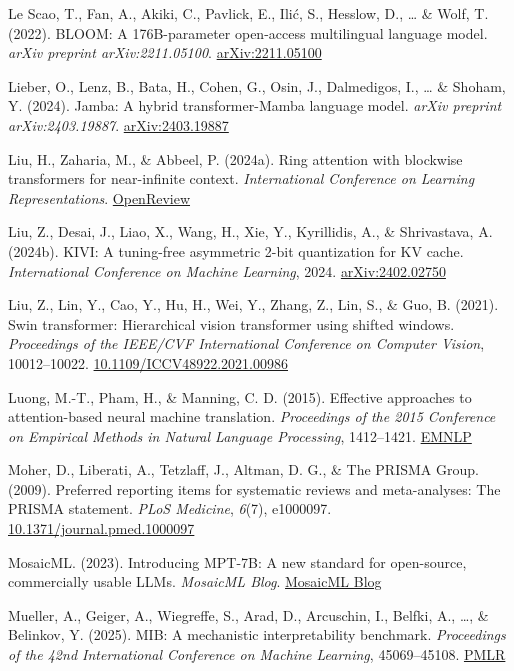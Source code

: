 \documentclass[10pt,twocolumn]{article}
\begin{document}
Le Scao, T., Fan, A., Akiki, C., Pavlick, E., Ilić, S., Hesslow, D., \ldots{} \& Wolf, T. (2022). BLOOM: A 176B-parameter open-access multilingual language model. \emph{arXiv preprint arXiv:2211.05100}. \href{https://arxiv.org/abs/2211.05100}{arXiv:2211.05100}

Lieber, O., Lenz, B., Bata, H., Cohen, G., Osin, J., Dalmedigos, I., \ldots{} \& Shoham, Y. (2024). Jamba: A hybrid transformer-Mamba language model. \emph{arXiv preprint arXiv:2403.19887}. \href{https://arxiv.org/abs/2403.19887}{arXiv:2403.19887}

Liu, H., Zaharia, M., \& Abbeel, P. (2024a). Ring attention with blockwise transformers for near-infinite context. \emph{International Conference on Learning Representations}. \href{https://openreview.net/forum?id=4po1ygKu5b}{OpenReview}

Liu, Z., Desai, J., Liao, X., Wang, H., Xie, Y., Kyrillidis, A., \& Shrivastava, A. (2024b). KIVI: A tuning-free asymmetric 2-bit quantization for KV cache. \emph{International Conference on Machine Learning}, 2024. \href{https://arxiv.org/abs/2402.02750}{arXiv:2402.02750}

Liu, Z., Lin, Y., Cao, Y., Hu, H., Wei, Y., Zhang, Z., Lin, S., \& Guo, B. (2021). Swin transformer: Hierarchical vision transformer using shifted windows. \emph{Proceedings of the IEEE/CVF International Conference on Computer Vision}, 10012--10022. \href{https://doi.org/10.1109/ICCV48922.2021.00986}{10.1109/ICCV48922.2021.00986}

Luong, M.-T., Pham, H., \& Manning, C. D. (2015). Effective approaches to attention-based neural machine translation. \emph{Proceedings of the 2015 Conference on Empirical Methods in Natural Language Processing}, 1412--1421. \href{https://aclanthology.org/D15-1166}{EMNLP}

Moher, D., Liberati, A., Tetzlaff, J., Altman, D. G., \& The PRISMA Group. (2009). Preferred reporting items for systematic reviews and meta-analyses: The PRISMA statement. \emph{PLoS Medicine}, \emph{6}(7), e1000097. \href{https://doi.org/10.1371/journal.pmed.1000097}{10.1371/journal.pmed.1000097}

MosaicML. (2023). Introducing MPT-7B: A new standard for open-source, commercially usable LLMs. \emph{MosaicML Blog}. \href{https://www.mosaicml.com/blog/mpt-7b}{MosaicML Blog}

Mueller, A., Geiger, A., Wiegreffe, S., Arad, D., Arcuschin, I., Belfki, A., \ldots, \& Belinkov, Y. (2025). MIB: A mechanistic interpretability benchmark. \emph{Proceedings of the 42nd International Conference on Machine Learning}, 45069--45108. \href{https://proceedings.mlr.press/v267/mueller25a.html}{PMLR}
\end{document}
